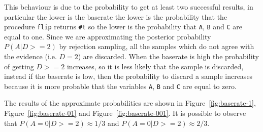 This behaviour is due to the probability to get at least two successful results, in particular the lower is the baserate the lower
is the probability that the procedure \texttt{flip} returns \texttt{\#t} so the lower is the probability that \texttt{A}, \texttt{B}
and \texttt{C} are equal to one.
Since we are approximating the posterior probability $ P(A | D >= 2) $ by rejection sampling, all the samples which do not agree with
the evidence (i.e. $D = 2$) are discarded. When the baserate is high the probability of getting $ D >= 2 $ increases, so it is
less likely that the sample is discarded, instead if the baserate is low, then the probability to discard a sample increases
because it is more probable that the variables \texttt{A}, \texttt{B} and \texttt{C} are equal to zero.

The results of the approximate probabilities are shown in Figure~\ref{fig:baserate-1}, Figure~\ref{fig:baserate-01} and
Figure~\ref{fig:baserate-001}. It is possible to observe that $ P(A = 0 | D >= 2) \approx 1/3 $ and 
$ P(A = 0 | D >= 2) \approx 2/3 $.

